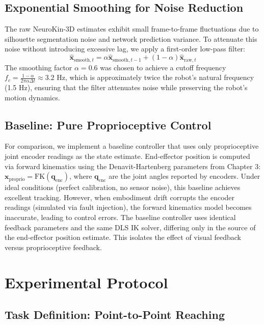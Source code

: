 \documentclass[12pt,a4paper,oneside]{report}
\begin{document}
\subsection{Exponential Smoothing for Noise Reduction}

The raw NeuroKin-3D estimates exhibit small frame-to-frame fluctuations due to silhouette segmentation noise and network prediction variance. To attenuate this noise without introducing excessive lag, we apply a first-order low-pass filter:
\begin{equation}
\hat{\mathbf{x}}_{\text{smooth},t} = \alpha \hat{\mathbf{x}}_{\text{smooth},t-1} + (1 - \alpha) \hat{\mathbf{x}}_{\text{raw},t}
\end{equation}
The smoothing factor $\alpha = 0.6$ was chosen to achieve a cutoff frequency $f_c = \frac{1-\alpha}{2\pi \alpha \Delta t} \approx 3.2$ Hz, which is approximately twice the robot's natural frequency (1.5 Hz), ensuring that the filter attenuates noise while preserving the robot's motion dynamics.

\subsection{Baseline: Pure Proprioceptive Control}

For comparison, we implement a baseline controller that uses only proprioceptive joint encoder readings as the state estimate. End-effector position is computed via forward kinematics using the Denavit-Hartenberg parameters from Chapter 3: $\mathbf{x}_{\text{proprio}} = \text{FK}(\mathbf{q}_{\text{enc}})$, where $\mathbf{q}_{\text{enc}}$ are the joint angles reported by encoders. Under ideal conditions (perfect calibration, no sensor noise), this baseline achieves excellent tracking. However, when embodiment drift corrupts the encoder readings (simulated via fault injection), the forward kinematics model becomes inaccurate, leading to control errors. The baseline controller uses identical feedback parameters and the same DLS IK solver, differing only in the source of the end-effector position estimate. This isolates the effect of visual feedback versus proprioceptive feedback.

\section{Experimental Protocol}

\subsection{Task Definition: Point-to-Point Reaching}
\end{document}

